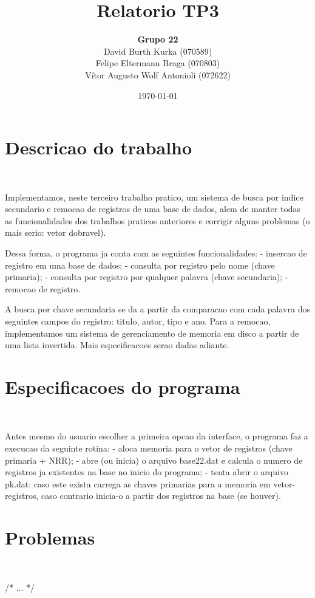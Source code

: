\documentclass{article}
\title{\textbf{Relatorio TP3}}
\author{\textbf{Grupo 22} \\
  David Burth Kurka (070589) \\
  Felipe Eltermann Braga (070803) \\
  Vítor Augusto Wolf Antonioli (072622)}
\date{\today}
\begin{document}
\maketitle

\section{Descricao do trabalho}\

Implementamos, neste terceiro trabalho pratico, um sistema de busca por indice secundario e remocao de registros de uma base de dados, alem de manter todas as funcionalidades dos trabalhos praticos anteriores e corrigir alguns problemas (o mais serio: vetor dobravel).

Dessa forma, o programa ja conta com as seguintes funcionalidades: 
- insercao de registro em uma base de dados; 
- consulta por registro pelo nome (chave primaria); 
- consulta por registro por qualquer palavra (chave secundaria); 
- remocao de registro.

A busca por chave secundaria se da a partir da comparacao com cada palavra dos seguintes campos do registro: titulo, autor, tipo e ano. Para a remocao, implementamos um sistema de gerenciamento de memoria em disco a partir de uma lista invertida. Mais especificacoes serao dadas adiante.

\section{Especificacoes do programa}\

Antes mesmo do usuario escolher a primeira opcao da interface, o programa faz a execucao da seguinte rotina: 
- aloca memoria para o vetor de registros (chave primaria + NRR); 
- abre (ou inicia) o arquivo base22.dat e calcula o numero de registros ja existentes na base no inicio do programa; 
- tenta abrir o arquivo pk.dat: caso este exista carrega as chaves primarias para a memoria em vetor-registros, caso contrario inicia-o a partir dos registros na base (se houver).



\section{Problemas}\

/* ... */
\end{document}
